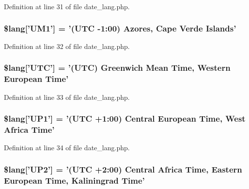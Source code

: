 Definition at line 31 of file date\-\_\-lang.\-php.

\hypertarget{date__lang_8php_a036e0074236b996b33231b051eda2973}{
\subsubsection[{\$lang}]{\setlength{\rightskip}{0pt plus 5cm}\$lang\mbox{[}'U\-M1'\mbox{]} = '(U\-T\-C -\/1\-:00) Azores, Cape Verde Islands'}}\label{date__lang_8php_a036e0074236b996b33231b051eda2973}


Definition at line 32 of file date\-\_\-lang.\-php.

\hypertarget{date__lang_8php_ab153b3219e74743184b7dee67e86f9fc}{
\subsubsection[{\$lang}]{\setlength{\rightskip}{0pt plus 5cm}\$lang\mbox{[}'U\-T\-C'\mbox{]} = '(U\-T\-C) Greenwich Mean Time, Western European Time'}}\label{date__lang_8php_ab153b3219e74743184b7dee67e86f9fc}


Definition at line 33 of file date\-\_\-lang.\-php.

\hypertarget{date__lang_8php_a788996558e6c8cafd788a1fef6b0be4e}{
\subsubsection[{\$lang}]{\setlength{\rightskip}{0pt plus 5cm}\$lang\mbox{[}'U\-P1'\mbox{]} = '(U\-T\-C +1\-:00) Central European Time, West Africa Time'}}\label{date__lang_8php_a788996558e6c8cafd788a1fef6b0be4e}


Definition at line 34 of file date\-\_\-lang.\-php.

\hypertarget{date__lang_8php_adfeba045961d07f8f30c0f1a7b8b4ff9}{
\subsubsection[{\$lang}]{\setlength{\rightskip}{0pt plus 5cm}\$lang\mbox{[}'U\-P2'\mbox{]} = '(U\-T\-C +2\-:00) Central Africa Time, Eastern European Time, Kaliningrad Time'}}\label{date__lang_8php_adfeba045961d07f8f30c0f1a7b8b4ff9}



